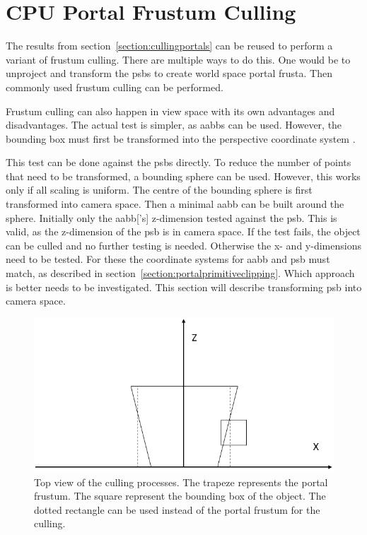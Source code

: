 \section{CPU Portal Frustum Culling}
\label{section:portalfrustumculling}
The results from section~\ref{section:cullingportals} can be reused to perform a variant of frustum culling. There are multiple ways to do this. One would be to unproject and transform the \glspl{psb} to create world space portal frusta. Then commonly used frustum culling can be performed.

Frustum culling can also happen in view space with its own advantages and disadvantages. The actual test is simpler, as \glspl{aabb} can be used. However, the bounding box must first be transformed into the perspective coordinate system \cite{assarsson:2000:optimized}.


This test can be done against the \glspl{psb} directly. To reduce the number of points that need to be transformed, a bounding sphere can be used. However, this works only if all scaling is uniform. The centre of the bounding sphere is first transformed into camera space. Then a minimal \gls{aabb} can be built around the sphere. Initially only the \gls{aabb}['s] z-dimension tested against the \gls{psb}. This is valid, as the z-dimension of the \gls{psb} is in camera space. If the test fails, the object can be culled and no further testing is needed. Otherwise the x- and y-dimensions need to be tested. For these the coordinate systems for \gls{aabb} and \gls{psb} must match, as described in section~\ref{section:portalprimitiveclipping}. Which approach is better needs to be investigated. This section will describe transforming \gls{psb} into camera space. 

\begin{figure}[h]
	\includegraphics[width=\linewidth]{images/frustumbox.png}
	\caption{Top view of the culling processes. The trapeze represents the portal frustum. The square represent the bounding box of the object. The dotted rectangle can be used instead of the portal frustum for the culling. }
	\label{fig:frustumbox}
\end{figure}

